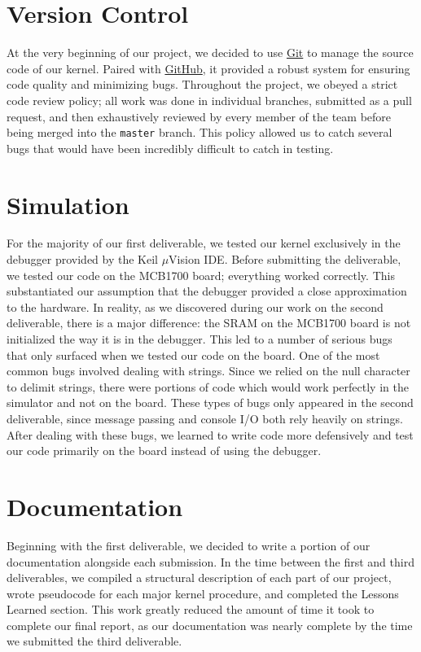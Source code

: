 \documentclass[12pt]{report}
\begin{document}
\section{Version Control}

At the very beginning of our project, we decided to use \href{http://git-scm.com/}{Git} to manage the source code of our kernel. Paired with \href{http://github.com/}{GitHub}, it provided a robust system for ensuring code quality and minimizing bugs. Throughout the project, we obeyed a strict code review policy; all work was done in individual branches, submitted as a pull request, and then exhaustively reviewed by every member of the team before being merged into the \texttt{master} branch. This policy allowed us to catch several bugs that would have been incredibly difficult to catch in testing.

\section{Simulation}

For the majority of our first deliverable, we tested our kernel exclusively in the debugger provided by the Keil $\mu$Vision IDE. Before submitting the deliverable, we tested our code on the MCB1700 board; everything worked correctly. This substantiated our assumption that the debugger provided a close approximation to the hardware. In reality, as we discovered during our work on the second deliverable, there is a major difference: the SRAM on the MCB1700 board is not initialized the way it is in the debugger. This led to a number of serious bugs that only surfaced when we tested our code on the board. One of the most common bugs involved dealing with strings. Since we relied on the null character to delimit strings, there were portions of code which would work perfectly in the simulator and not on the board. These types of bugs only appeared in the second deliverable, since message passing and console I/O both rely heavily on strings. After dealing with these bugs, we learned to write code more defensively and test our code primarily on the board instead of using the debugger.

\section{Documentation}

Beginning with the first deliverable, we decided to write a portion of our documentation alongside each submission. In the time between the first and third deliverables, we compiled a structural description of each part of our project, wrote pseudocode for each major kernel procedure, and completed the Lessons Learned section. This work greatly reduced the amount of time it took to complete our final report, as our documentation was nearly complete by the time we submitted the third deliverable.
\end{document}
